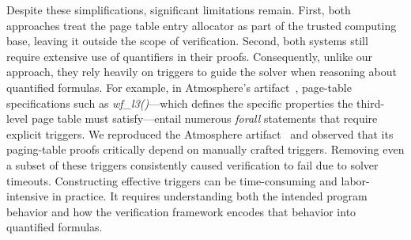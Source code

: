 Despite these simplifications, significant limitations remain. First, both approaches treat the page table entry allocator as part of the trusted computing base, leaving it outside the scope of verification. Second, both systems still require extensive use of quantifiers in their proofs. Consequently, unlike our approach, they rely heavily on triggers to guide the solver when reasoning about quantified formulas. For example, in Atmosphere's artifact~\cite{atmosphere-artifact}, page-table specifications such as \emph{wf\_l3()}—which defines the specific properties the third-level page table must satisfy—entail numerous \emph{forall} statements that require explicit triggers. We reproduced the Atmosphere artifact~\cite{atmosphere-artifact} and observed that its paging-table proofs critically depend on manually crafted triggers. Removing even a subset of these triggers consistently caused verification to fail due to solver timeouts.
Constructing effective triggers can be time-consuming and labor-intensive in practice. It requires understanding both the intended program behavior and how the verification framework encodes that behavior into quantified formulas.



